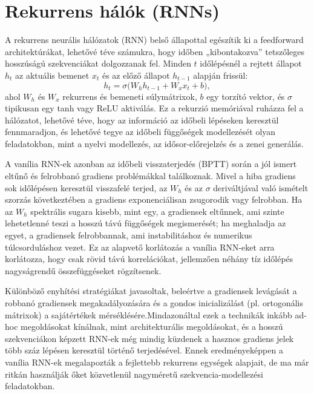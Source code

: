 \section{Rekurrens hálók (RNNs)}
A rekurrens neurális hálózatok (RNN) belső állapottal egészítik ki a feedforward architektúrákat, lehetővé téve számukra, hogy időben „kibontakozva” tetszőleges hosszúságú szekvenciákat dolgozzanak fel. Minden \(t\) időlépésnél a rejtett állapot \(h_t\) az aktuális bemenet \(x_t\) és az előző állapot \(h_{t-1}\) alapján frissül:
\[
h_t = \sigma\bigl(W_h h_{t-1} + W_x x_t + b\bigr),
\]
ahol \(W_h\) és \(W_x\) rekurrens és bemeneti súlymátrixok, \(b\) egy torzító vektor, és \(\sigma\) tipikusan egy tanh vagy ReLU aktiválás.  Ez a rekurzió memóriával ruházza fel a hálózatot, lehetővé téve, hogy az információ az időbeli lépéseken keresztül fennmaradjon, és lehetővé tegye az időbeli függőségek modellezését olyan feladatokban, mint a nyelvi modellezés, az idősor-előrejelzés és a zenei generálás.

A vanília RNN-ek azonban az időbeli visszaterjedés (BPTT) során a jól ismert eltűnő és felrobbanó gradiens problémákkal találkoznak. Mivel a hiba gradiens sok időlépésen keresztül visszafelé terjed, az \(W_h\) és az \(\sigma\) deriváltjával való ismételt szorzás következtében a gradiens exponenciálisan zsugorodik vagy felrobban. Ha az \(W_h\) spektrális sugara kisebb, mint egy, a gradiensek eltűnnek, ami szinte lehetetlenné teszi a hosszú távú függőségek megismerését; ha meghaladja az egyet, a gradiensek felrobbannak, ami instabilitáshoz és numerikus túlcsorduláshoz vezet. Ez az alapvető korlátozás a vanília RNN-eket arra korlátozza, hogy csak rövid távú korrelációkat, jellemzően néhány tíz időlépés nagyságrendű összefüggéseket rögzítsenek. 

Különböző enyhítési stratégiákat javasoltak, beleértve a gradiensek levágását a robbanó gradiensek megakadályozására és a gondos inicializálást (pl. ortogonális mátrixok) a sajátértékek mérséklésére.Mindazonáltal ezek a technikák inkább ad-hoc megoldásokat kínálnak, mint architekturális megoldásokat, és a hosszú szekvenciákon képzett RNN-ek még mindig küzdenek a hasznos gradiens jelek több száz lépésen keresztül történő terjedésével. Ennek eredményeképpen a vanília RNN-ek megalapozták a fejlettebb rekurrens egységek alapjait, de ma már ritkán használják őket közvetlenül nagyméretű szekvencia-modellezési feladatokban.

